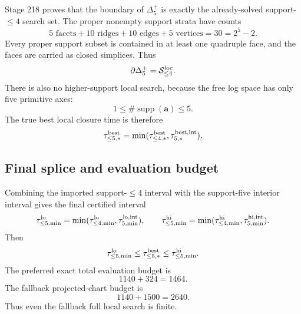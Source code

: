 Stage 218 proves that the boundary of \(\Delta_5^+\) is exactly the already-solved support-\(\le4\) search set.  The proper nonempty support strata have counts
\begin{equation}
\label{eq:part06-boundary-strata-counts}
5\text{ facets}+10\text{ ridges}+10\text{ edges}+5\text{ vertices}=30=2^5-2.
\end{equation}
Every proper support subset is contained in at least one quadruple face, and the faces are carried as closed simplices.  Thus
\begin{equation}
\label{eq:part06-boundary-identification}
\partial\Delta_5^+=\mathcal S_{\le4}^{\rm loc}.
\end{equation}
There is also no higher-support local search, because the free log space has only five primitive axes:
\begin{equation}
\label{eq:part06-support-ceiling}
1\le \#\operatorname{supp}(\mathbf a)\le5.
\end{equation}
The true best local closure time is therefore
\begin{equation}
\label{eq:part06-best-le5-true}
\tau_{\le5,*}^{\rm best}
=
\min(\tau_{\le4,*}^{\rm best},\tau_{5,*}^{\rm best,int}).
\end{equation}

\subsection{Final splice and evaluation budget}
\label{subsec:part06-final-splice-evaluation-budget}

Combining the imported support-\(\le4\) interval with the support-five interior interval gives the final certified interval
\begin{equation}
\label{eq:part06-final-splice}
\tau_{\le5,\min}^{\rm lo}
=
\min(\tau_{\le4,\min}^{\rm lo},\tau_{5,\min}^{\rm lo,int}),
\qquad
\tau_{\le5,\min}^{\rm hi}
=
\min(\tau_{\le4,\min}^{\rm hi},\tau_{5,\min}^{\rm hi,int}).
\end{equation}
Then
\begin{equation}
\label{eq:part06-final-splice-bound}
\tau_{\le5,\min}^{\rm lo}
\le
\tau_{\le5,*}^{\rm best}
\le
\tau_{\le5,\min}^{\rm hi}.
\end{equation}
The preferred exact total evaluation budget is
\begin{equation}
\label{eq:part06-final-budget}
1140+324=1464.
\end{equation}
The fallback projected-chart budget is
\begin{equation}
\label{eq:part06-fallback-budget}
1140+1500=2640.
\end{equation}
Thus even the fallback full local search is finite.

